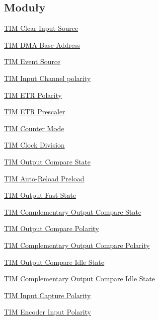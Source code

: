 \subsection*{Moduły}
\begin{DoxyCompactItemize}
\item 
\hyperlink{group___t_i_m___clear_input___source}{T\+I\+M Clear Input Source}
\item 
\hyperlink{group___t_i_m___d_m_a___base__address}{T\+I\+M D\+M\+A Base Address}
\item 
\hyperlink{group___t_i_m___event___source}{T\+I\+M Event Source}
\item 
\hyperlink{group___t_i_m___input___channel___polarity}{T\+I\+M Input Channel polarity}
\item 
\hyperlink{group___t_i_m___e_t_r___polarity}{T\+I\+M E\+T\+R Polarity}
\item 
\hyperlink{group___t_i_m___e_t_r___prescaler}{T\+I\+M E\+T\+R Prescaler}
\item 
\hyperlink{group___t_i_m___counter___mode}{T\+I\+M Counter Mode}
\item 
\hyperlink{group___t_i_m___clock_division}{T\+I\+M Clock Division}
\item 
\hyperlink{group___t_i_m___output___compare___state}{T\+I\+M Output Compare State}
\item 
\hyperlink{group___t_i_m___auto_reload_preload}{T\+I\+M Auto-\/\+Reload Preload}
\item 
\hyperlink{group___t_i_m___output___fast___state}{T\+I\+M Output Fast State}
\item 
\hyperlink{group___t_i_m___output___compare___n___state}{T\+I\+M Complementary Output Compare State}
\item 
\hyperlink{group___t_i_m___output___compare___polarity}{T\+I\+M Output Compare Polarity}
\item 
\hyperlink{group___t_i_m___output___compare___n___polarity}{T\+I\+M Complementary Output Compare Polarity}
\item 
\hyperlink{group___t_i_m___output___compare___idle___state}{T\+I\+M Output Compare Idle State}
\item 
\hyperlink{group___t_i_m___output___compare___n___idle___state}{T\+I\+M Complementary Output Compare Idle State}
\item 
\hyperlink{group___t_i_m___input___capture___polarity}{T\+I\+M Input Capture Polarity}
\item 
\hyperlink{group___t_i_m___encoder___input___polarity}{T\+I\+M Encoder Input Polarity}
\item 

\end{DoxyCompactItemize}
